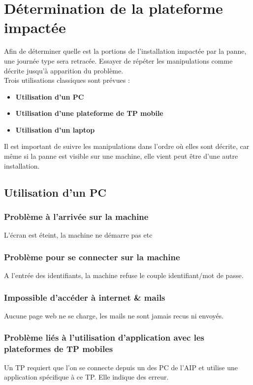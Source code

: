 \documentclass[a4paper]{article}
\begin{document}
\section{Détermination de la plateforme impactée}
Afin de déterminer quelle est la portions de l'installation impactée par la panne, une journée type sera retracée. Essayer de répéter les manipulations comme décrite jusqu'à apparition du problème.\\
Trois utilisations classiques sont prévues : 
\begin{itemize}
	\item \textbf{Utilisation d'un PC}
	\item \textbf{Utilisation d'une plateforme de TP mobile}
	\item \textbf{Utilisation d'un laptop}
\end{itemize}

Il est important de suivre les manipulations dans l'ordre où elles sont décrite, car même si la panne est visible sur une machine, elle vient peut être d'une autre installation.


\subsection{Utilisation d'un PC}
\subsubsection{Problème à l'arrivée sur la machine}
L'écran est éteint, la machine ne démarre pas etc

\subsubsection{Problème pour se connecter sur la machine}
A l'entrée des identifiants, la machine refuse le couple identifiant/mot de passe.

\subsubsection{Impossible d'accéder à internet \& mails}
Aucune page web ne se charge, les mails ne sont jamais recus ni envoyés.

\subsubsection{Problème liés à l'utilisation d'application avec les plateformes de TP mobiles}
Un TP requiert que l'on se connecte depuis un des PC de l'AIP et utilise une application spécifique à ce TP. Elle indique des erreur.
		
\end{document}
